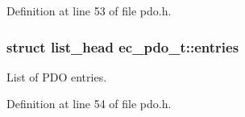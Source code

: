 Definition at line 53 of file pdo.\-h.

\subsubsection[{entries}]{\setlength{\rightskip}{0pt plus 5cm}struct list\-\_\-head ec\-\_\-pdo\-\_\-t\-::entries}\label{structec__pdo__t_aaac321c4f80081e5f69e2ff30eac80e5}


List of P\-D\-O entries. 



Definition at line 54 of file pdo.\-h.

